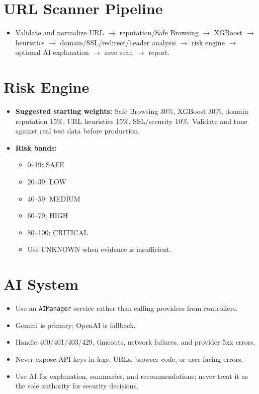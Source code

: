 \documentclass[11pt,a4paper]{article}
\begin{document}
\section{URL Scanner Pipeline}
\begin{itemize}[noitemsep]
    \item Validate and normalize URL $\rightarrow$ reputation/Safe Browsing $\rightarrow$ XGBoost $\rightarrow$ heuristics $\rightarrow$ domain/SSL/redirect/header analysis $\rightarrow$ risk engine $\rightarrow$ optional AI explanation $\rightarrow$ save scan $\rightarrow$ report.
\end{itemize}

\section{Risk Engine}
\begin{itemize}
    \item \textbf{Suggested starting weights:} Safe Browsing 30\%, XGBoost 30\%, domain reputation 15\%, URL heuristics 15\%, SSL/security 10\%. Validate and tune against real test data before production.
    \item \textbf{Risk bands:}
    \begin{itemize}[noitemsep]
        \item 0–19: SAFE
        \item 20–39: LOW
        \item 40–59: MEDIUM
        \item 60–79: HIGH
        \item 80–100: CRITICAL
        \item Use UNKNOWN when evidence is insufficient.
    \end{itemize}
\end{itemize}

\section{AI System}
\begin{itemize}[noitemsep]
    \item Use an \texttt{AIManager} service rather than calling providers from controllers.
    \item Gemini is primary; OpenAI is fallback.
    \item Handle 400/401/403/429, timeouts, network failures, and provider 5xx errors.
    \item Never expose API keys in logs, URLs, browser code, or user-facing errors.
    \item Use AI for explanation, summaries, and recommendations; never treat it as the sole authority for security decisions.
\end{itemize}
\end{document}
